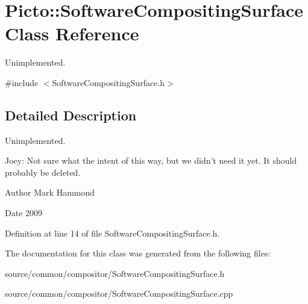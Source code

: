 \hypertarget{class_picto_1_1_software_compositing_surface}{\section{Picto\-:\-:Software\-Compositing\-Surface Class Reference}
\label{class_picto_1_1_software_compositing_surface}
}


Unimplemented.  




{\ttfamily \#include $<$Software\-Compositing\-Surface.\-h$>$}



\subsection{Detailed Description}
Unimplemented. 

Joey\-: Not sure what the intent of this way, but we didn't need it yet. It should probably be deleted. \begin{DoxyAuthor}{Author}
Mark Hammond 
\end{DoxyAuthor}
\begin{DoxyDate}{Date}
2009 
\end{DoxyDate}


Definition at line 14 of file Software\-Compositing\-Surface.\-h.



The documentation for this class was generated from the following files\-:\begin{DoxyCompactItemize}
\item 
source/common/compositor/Software\-Compositing\-Surface.\-h\item 
source/common/compositor/Software\-Compositing\-Surface.\-cpp\end{DoxyCompactItemize}
